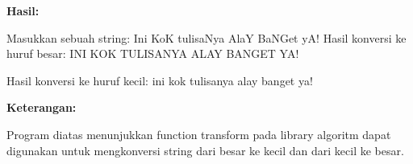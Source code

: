 \textbf{Hasil:}

\begin{lcverbatim}
Masukkan sebuah string:
Ini KoK tulisaNya AlaY BaNGet yA!
Hasil konversi ke huruf besar:
INI KOK TULISANYA ALAY BANGET YA!

Hasil konversi ke huruf kecil:
ini kok tulisanya alay banget ya!
\end{lcverbatim}

\textbf{Keterangan:}

Program diatas menunjukkan function transform pada library algoritm
dapat digunakan untuk mengkonversi string dari besar ke kecil dan dari
kecil ke besar.
